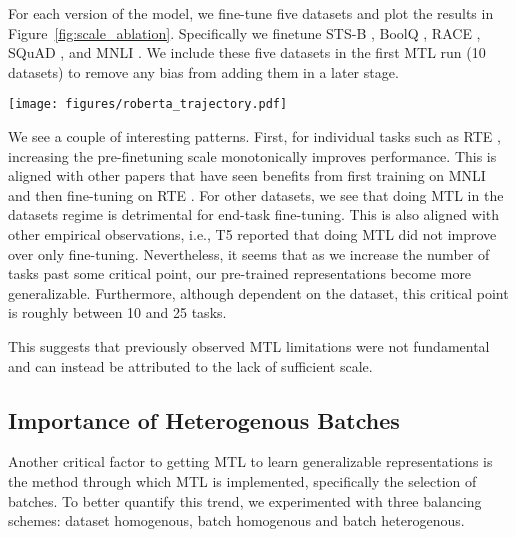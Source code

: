\documentclass[11pt,a4paper]{article}
\begin{document}
For each version of the model, we fine-tune five datasets and plot the results in Figure~\ref{fig:scale_ablation}. Specifically we finetune STS-B \citep{stsb}, BoolQ \citep{clark2019boolq}, RACE \citep{race}, SQuAD \citep{race}, and MNLI \citep{mnli}. We include these five datasets in the first MTL run (10 datasets) to remove any bias from adding them in a later stage.

\begin{figure*}
    \centering
    \texttt{[image: figures/roberta\_trajectory.pdf]}
    \caption{We plot the RoBERTa evaluation accuracy of five datasets: RTE, BoolQ, RACE, SQuAD, and MNLI, across various scales of multi-task learning measured in the number of datasets. We notice that performance initially degrades until a critical point is reached regarding the number of the datasets used by the MTL framework for all but one dataset. Post this critical point; our representations improve over the original RoBERTa model.}
    \label{fig:scale_ablation}
\end{figure*}

We see a couple of interesting patterns. First, for individual tasks such as RTE \citep{rte}, increasing the pre-finetuning scale monotonically improves performance. This is aligned with other papers that have seen benefits from first training on MNLI \citep{mnli} and then fine-tuning on RTE \citep{ROBERTA}. For other datasets, we see that doing MTL in the  datasets regime is detrimental for end-task fine-tuning. This is also aligned with other empirical observations, i.e., T5 reported that doing MTL did not improve over only fine-tuning. Nevertheless, it seems that as we increase the number of tasks past some critical point, our pre-trained representations become more generalizable. Furthermore, although dependent on the dataset, this critical point is roughly between 10 and 25 tasks. 


This suggests that previously observed MTL limitations were not fundamental and can instead be attributed to the lack of sufficient scale.

\subsection{Importance of Heterogenous Batches}
\label{sec:batches}
Another critical factor to getting MTL to learn generalizable representations is the method through which MTL is implemented, specifically the selection of batches. To better quantify this trend, we experimented with three balancing schemes: dataset homogenous, batch homogenous and batch heterogenous.
\end{document}
